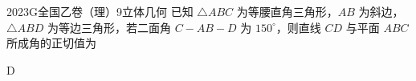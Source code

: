 
\begin{problem}{2023}{G}{全国乙卷（理）}{9}{立体几何}
已知 $ \triangle ABC $ 为等腰直角三角形，$ AB $ 为斜边，$ \triangle ABD $ 为等边三角形，若二面角 $ C{-}AB{-}D $ 为 $ 150^\circ $，则直线 $ CD $ 与平面 $ ABC $ 所成角的正切值为
\begin{choices}
\end{choices}
\end{problem}

\begin{answer}
D
\end{answer}

\begin{solutions}

\end{solutions}
